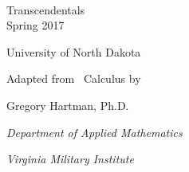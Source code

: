 


\begin{flushright}

\textsc{\large \apex\ {\Huge\thetitle}} \\

 Transcendentals \\
Spring 2017 \\

%

\Large

University of North Dakota\bigskip

\normalsize

Adapted from \apex\ Calculus by

Gregory Hartman, Ph.D.

\emph{\small Department of Applied Mathematics}

\emph{\small Virginia Military Institute}

\end{flushright}
\normalsize
{}
\restoregeometry
